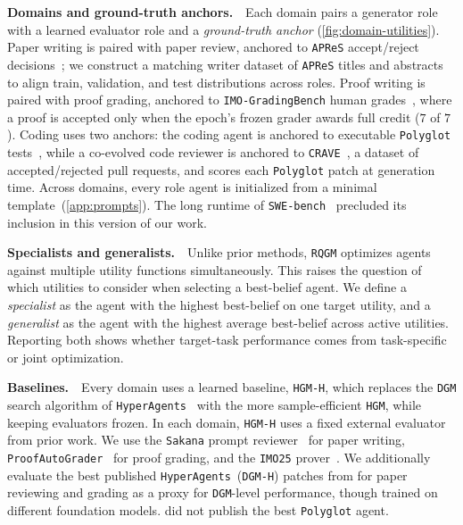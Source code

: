 \documentclass{paper}
\newcommand{\ourmethod}{\texttt{RQGM}\xspace}
\newcommand{\hgm}{\texttt{HGM}\xspace}
\newcommand{\hgmh}{\texttt{HGM-H}\xspace}
\newcommand{\dgm}{\texttt{DGM}\xspace}
\newcommand{\dgmh}{\texttt{DGM-H}\xspace}
\newcommand{\hyperagents}{\texttt{HyperAgents}\xspace}
\newcommand{\proofautograder}{\texttt{ProofAutoGrader}\xspace}
\newcommand{\sakana}{\texttt{Sakana}\xspace}
\newcommand{\imocode}{\texttt{IMO25}\xspace}
\newcommand{\apres}{\texttt{APReS}\xspace}
\newcommand{\polyglot}{\texttt{Polyglot}\xspace}
\newcommand{\crave}{\texttt{CRAVE}\xspace}
\newcommand{\imogradbench}{\texttt{IMO-GradingBench}\xspace}
\newcommand{\swebench}{\texttt{SWE-bench}\xspace}
\begin{document}
\noindent\textbf{Domains and ground-truth anchors.}~~Each domain pairs a generator role with a learned evaluator role and a \emph{ground-truth anchor} (\cref{fig:domain-utilities}). Paper writing is paired with paper review,  anchored to \apres accept/reject decisions~\citep{zhao2026apres}; we construct a matching writer dataset of \apres titles and abstracts to align train, validation, and test distributions across roles. Proof writing is paired with  proof grading, anchored to \imogradbench human grades~\citep{luong2025towards}, where a proof is accepted only when the epoch's frozen grader awards full credit ($7$ of $7$). Coding uses two anchors: the coding agent is anchored to executable \polyglot tests~\citep{gauthier2024polyglot}, while a co-evolved code reviewer is anchored to \crave~\citep{zhang2025crave}, a dataset of accepted/rejected pull requests, and scores each \polyglot patch at generation time.  Across domains, every role agent is initialized from a minimal template~(\cref{app:prompts}). The long runtime of \swebench~\citep{jimenez2024swebench} precluded its inclusion in this version of our work.

\noindent\textbf{Specialists and generalists.}~~Unlike prior methods, \ourmethod optimizes agents against multiple utility functions simultaneously. This raises the question of which utilities to consider when selecting a best-belief agent. We define a \emph{specialist} as the agent with the highest best-belief on one target utility, and a \emph{generalist} as the agent with the highest average best-belief across active utilities. Reporting both shows whether target-task performance comes from task-specific or joint optimization.

\noindent\textbf{Baselines.}~~Every domain uses a learned baseline, \hgmh, which replaces the \dgm search algorithm of \hyperagents~\citep{zhang2026hyperagents} with the more sample-efficient \hgm, while keeping evaluators frozen.  In each domain, \hgmh uses a fixed external evaluator from prior work. We use the \sakana prompt reviewer~\citep{lu2024ai} for paper  writing, \proofautograder~\citep{luong2025towards} for proof grading, and the \imocode prover~\citep{huang2025winninggoldimo2025}. We additionally evaluate the best published \hyperagents~(\dgmh) patches from \citet{zhang2026hyperagents} for paper reviewing and grading as a proxy for \dgm-level performance, though trained on different foundation models.  \citet{zhang2026hyperagents} did not publish the best \polyglot agent.
\end{document}
